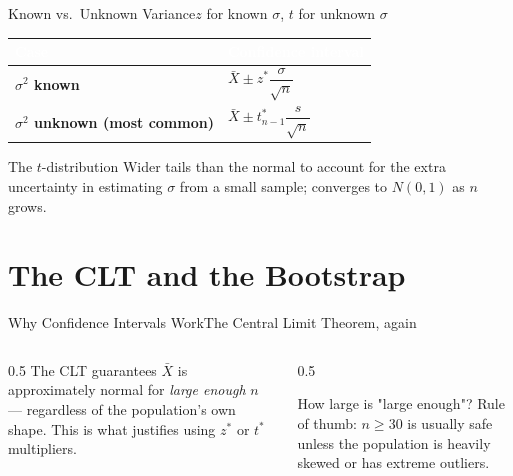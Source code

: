 \documentclass[aspectratio=169,11pt]{beamer}
\begin{document}
\begin{frame}{Known vs.\ Unknown Variance}{$z$ for known $\sigma$, $t$ for unknown $\sigma$}
  \small
  \renewcommand{\arraystretch}{1.35}
  \begin{center}
  \begin{tabularx}{\textwidth}{@{}>{\bfseries}l >{\raggedright\arraybackslash}X@{}}
    \toprule
    \rowcolor{PrimaryDark}
    \textcolor{white}{Case} & \textcolor{white}{Confidence interval} \\
    \midrule
    $\sigma^2$ known & $\bar X \pm z^\ast \dfrac{\sigma}{\sqrt n}$ \\
    \rowcolor{PrimaryLight!25}
    $\sigma^2$ unknown (most common) & $\bar X \pm t^\ast_{n-1} \dfrac{s}{\sqrt n}$ \\
    \bottomrule
  \end{tabularx}
  \end{center}
  \begin{exampleblock}{The $t$-distribution}
    \small Wider tails than the normal to account for the extra
    uncertainty in estimating $\sigma$ from a small sample; converges to
    $N(0,1)$ as $n$ grows.
  \end{exampleblock}
\end{frame}

\section{The CLT and the Bootstrap}

\begin{frame}{Why Confidence Intervals Work}{The Central Limit Theorem, again}
  \begin{columns}[T]
    \begin{column}{0.5\textwidth}
      \small The CLT guarantees $\bar X$ is approximately normal for
      \emph{large enough} $n$ — regardless of the population's own shape.
      This is what justifies using $z^\ast$ or $t^\ast$ multipliers.
    \end{column}
    \begin{column}{0.5\textwidth}
      \begin{exampleblock}{How large is "large enough"?}
        \small Rule of thumb: $n \ge 30$ is usually safe unless the
        population is heavily skewed or has extreme outliers.
      \end{exampleblock}
    \end{column}
  \end{columns}
\end{frame}
\end{document}
